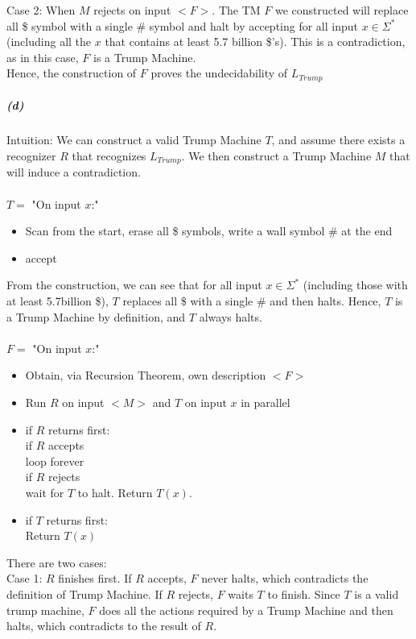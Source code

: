 \documentclass[11pt]{article}
\newcommand\tab[1][1cm]{\hspace*{#1}}
\begin{document}
Case 2: When $M$ rejects on input $<F>$. The TM $F$ we constructed will replace all \$ symbol with a single \# symbol and halt by accepting for all input $x \in \Sigma^*$ (including all the $x$ that contains at least 5.7 billion \$'s). This is a contradiction, as in this case, $F$ is a Trump Machine. \\

Hence, the construction of $F$ proves the undecidability of $L_{Trump}$

\subparagraph{(d)}
Intuition: We can construct a valid Trump Machine $T$, and assume there exists a recognizer $R$ that recognizes $L_{Trump}$. We then construct a Trump Machine $M$ that will induce a contradiction. \\~\\

$T=$ "On input $x$:"
\begin{itemize}
\item Scan from the start, erase all \$ symbols, write a wall symbol \# at the end
\item accept
\end{itemize}

From the construction, we can see that for all input $x \in \Sigma^*$ (including those with at least 5.7billion \$), $T$ replaces all \$ with a single \# and then halts. Hence, $T$ is a Trump Machine by definition, and $T$ always halts. \\~\\

$F=$ "On input $x$:"
\begin{itemize}
\item Obtain, via Recursion Theorem, own description $<F>$
\item Run $R$ on input $<M>$ and $T$ on input $x$ in parallel
\item if $R$ returns first: \\
\tab if $R$ accepts \\
\tab \tab loop forever \\
\tab if $R$ rejects \\
\tab \tab  wait for $T$ to halt. Return $T(x)$. 
\item if $T$ returns first: \\
\tab  Return $T(x)$
\end{itemize}

There are two cases: \\

Case 1: $R$ finishes first. If $R$ accepts, $F$ never halts, which contradicts the definition of Trump Machine. If $R$ rejects, $F$ waits $T$ to finish. Since $T$ is a valid trump machine, $F$ does all the actions required by a Trump Machine and then halts, which contradicts to the result of $R$. \\
\end{document}
